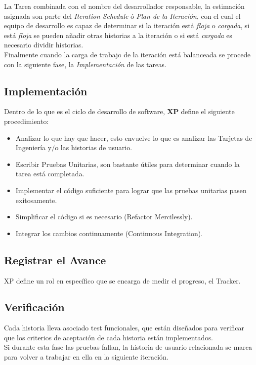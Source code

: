       La Tarea combinada con el nombre del desarrollador responsable, la estimación asignada son parte del \emph{Iteration Schedule} \'o \emph{Plan de la Iteración}, con el cual el equipo de desarrollo es capaz de determinar si la iteración está \emph{floja} o \emph{cargada}, si está \emph{floja} se pueden añadir otras historias a la iteración o si está \emph{cargada} es necesario dividir historias.\\
      Finalmente cuando la carga de trabajo de la iteración está balanceada se procede con la siguiente fase, la \emph{Implementación} de las tareas.



      \subsection{Implementación}
      \label{sub:implementacion}

      Dentro de lo que es el ciclo de desarrollo de software, \textbf{XP} define el siguiente procedimiento:

      \begin{itemize}
        \item Analizar lo que hay que hacer, esto envuelve lo que es analizar las Tarjetas de Ingeniería y/o las historias de usuario. %
        \item Escribir Pruebas Unitarias, son bastante útiles para determinar cuando la tarea está completada.
        \item Implementar el código suficiente para lograr que las pruebas unitarias pasen exitosamente.
        \item Simplificar el código si es necesario (Refactor Mercilessly).
        \item Integrar los cambios continuamente (Continuous Integration).
      \end{itemize}

      \subsection{Registrar el Avance}
      \label{sub:registrar_avance}
      XP define un rol en específico que se encarga de medir el progreso, el Tracker.

      \subsection{Verificación}
      \label{sub:verificacion}
      Cada historia lleva asociado test funcionales, que están diseñados para verificar que los criterios de aceptación de cada historia están implementados. \\
      Si durante esta fase las pruebas fallan, la historia de usuario relacionada se marca para volver a trabajar en ella en la siguiente iteración.\\


